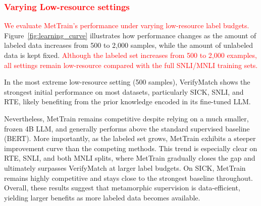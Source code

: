 \documentclass[lettersize,journal]{IEEEtran}
\newcommand{\red}[1]{\textcolor{red}{#1}}
\newcommand{\best}[1]{\cellcolor{gray!65}\textbf{#1}}
\begin{document}



\subsubsection{\red{Varying Low-resource settings}}

\red{We evaluate MetTrain's performance under varying low-resource label budgets.}
Figure~\ref{fig:learning_curve} illustrates how performance changes as the amount of labeled data increases from 500 to 2,000 samples, while the amount of unlabeled data is kept fixed. \red{Although the labeled set increases from 500 to 2,000 examples, all settings remain low-resource compared with the full SNLI/MNLI training sets.}

In the most extreme low-resource setting (500 samples), VerifyMatch shows the strongest initial performance on most datasets, particularly SICK, SNLI, and RTE, likely benefiting from the prior knowledge encoded in its fine-tuned LLM.

Nevertheless, MetTrain remains competitive despite relying on a much smaller, frozen 4B LLM, and generally performs above the standard supervised baseline (BERT). More importantly, as the labeled set grows, MetTrain exhibits a steeper improvement curve than the competing methods. This trend is especially clear on RTE, SNLI, and both MNLI splits, where MetTrain gradually closes the gap and ultimately surpasses VerifyMatch at larger label budgets. On SICK, MetTrain remains highly competitive and stays close to the strongest baseline throughout. Overall, these results suggest that metamorphic supervision is data-efficient, yielding larger benefits as more labeled data becomes available.
\end{document}
